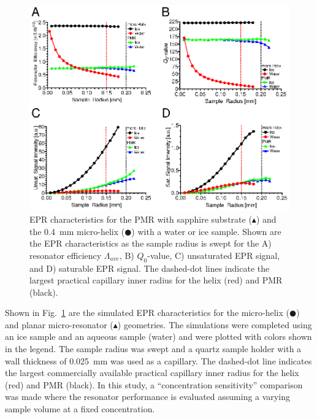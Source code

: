 \begin{figure}[ht]
 \centering
 \includegraphics[width=\textwidth]{Kapitel/Ch2-Images/Ch2-SweepOutputA.eps}
 \caption[EPR characteristics as the sample radius is swept.]{EPR characteristics for the PMR with sapphire substrate ($\blacktriangle$) and the 0.4~mm micro-helix ($\CIRCLE$) with a water or ice sample. Shown are the EPR characteristics as the sample radius is swept for the A) resonator efficiency $\Lambda_{ave}$, B) $Q_0$-value, C) unsaturated EPR signal, and D) saturable EPR signal. The dashed-dot lines indicate the largest practical capillary inner radius for the helix (red) and PMR (black).}
 \label{fig:SweptData}
\end{figure}

Shown in Fig.~\ref{fig:SweptData} are the simulated EPR characteristics for the micro-helix ($\CIRCLE$) and planar micro-resonator ($\blacktriangle$) geometries. The simulations were completed using an ice sample and an aqueous sample (water) and were plotted with colors shown in the legend. The sample radius was swept and a quartz sample holder with a wall thickness of 0.025~mm was used as a capillary. The dashed-dot line indicates the largest commercially available practical capillary inner radius for the helix (red) and PMR (black). In this study, a ``concentration sensitivity'' comparison was made where the resonator performance is evaluated assuming a varying sample volume at a fixed concentration.

